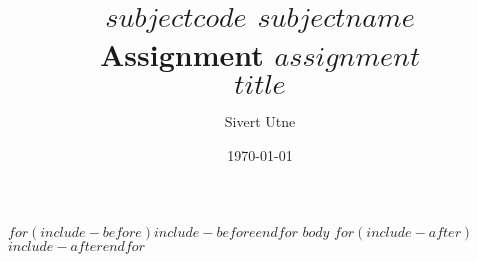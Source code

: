 \documentclass[]{$documentclass$}
\title{
    {\normalsize $subjectcode$ $subjectname$\\
    \vspace{10mm}
    Assignment $assignment$}\\
    \textbf{$title$}
}
\author{Sivert Utne}
\date{\today}
\begin{document}
    \maketitle

    \vfill
    \tableofcontents 
    \thispagestyle{empty}

    $for(include-before)$$include-before$$endfor$
    \clearpage
    \renewcommand{\arraystretch}{1.3}
    \setcounter{page}{1}
    $body$ %
    $for(include-after)$$include-after$$endfor$
\end{document}
